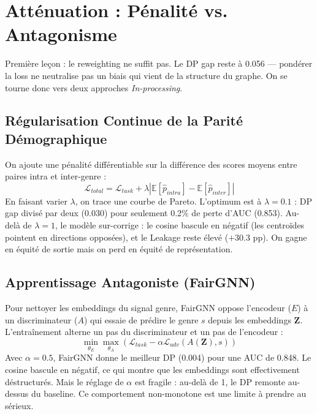 \documentclass[conference, a4paper]{IEEEtran}
\begin{document}
\section{Atténuation : Pénalité vs. Antagonisme}

Première leçon : le reweighting \cite{kamiran2012data} ne suffit pas. Le DP gap reste à 0.056 — pondérer la loss ne neutralise pas un biais qui vient de la structure du graphe. On se tourne donc vers deux approches \textit{In-processing}.

\subsection{Régularisation Continue de la Parité Démographique}
On ajoute une pénalité différentiable sur la différence des scores moyens entre paires intra et inter-genre \cite{agarwal2018reductions} :
\begin{equation}
\mathcal{L}_{total} = \mathcal{L}_{task} + \lambda \left| \mathbb{E}[\hat{p}_{intra}] - \mathbb{E}[\hat{p}_{inter}] \right|
\end{equation}
En faisant varier $\lambda$, on trace une courbe de Pareto. L'optimum est à $\lambda=0.1$ : DP gap divisé par deux (0.030) pour seulement 0.2\% de perte d'AUC (0.853). Au-delà de $\lambda = 1$, le modèle sur-corrige : le cosine bascule en négatif (les centroïdes pointent en directions opposées), et le Leakage reste élevé ($+30.3$ pp). On gagne en équité de sortie mais on perd en équité de représentation.

\subsection{Apprentissage Antagoniste (FairGNN)}
Pour nettoyer les embeddings du signal genre, FairGNN \cite{dai2021say} oppose l'encodeur ($E$) à un discriminateur ($A$) qui essaie de prédire le genre $s$ depuis les embeddings $\mathbf{Z}$. L'entraînement alterne un pas du discriminateur et un pas de l'encodeur :
\begin{equation}
\min_{\theta_E} \max_{\theta_A} \left( \mathcal{L}_{task} - \alpha \mathcal{L}_{adv}(A(\mathbf{Z}), s) \right)
\end{equation}
Avec $\alpha=0.5$, FairGNN donne le meilleur DP (0.004) pour une AUC de 0.848. Le cosine bascule en négatif, ce qui montre que les embeddings sont effectivement déstructurés. Mais le réglage de $\alpha$ est fragile : au-delà de 1, le DP remonte au-dessus du baseline. Ce comportement non-monotone est une limite à prendre au sérieux.
\end{document}
